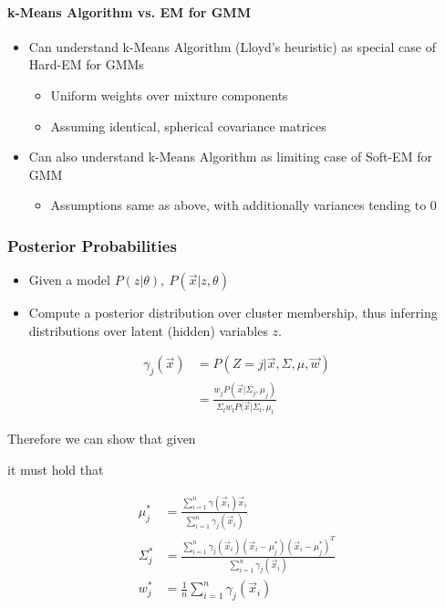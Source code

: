 \documentclass[10pt,a4paper]{scrartcl}
\newcommand{\Argmin}[2]{\text{arg}\underset{#1}{\min}\left(#2\right)}
\begin{document}
\begin{multicols*}{2}
\paragraph{k-Means Algorithm vs. EM for GMM}

\begin{itemize}
\item Can understand k-Means Algorithm (Lloyd's heuristic) as special case of Hard-EM for GMMs
\begin{itemize}
\item Uniform weights over mixture components
\item Assuming identical, spherical covariance matrices
\end{itemize}
\item Can also understand k-Means Algorithm as limiting case of Soft-EM for GMM
\begin{itemize}
\item Assumptions same as above, with additionally variances tending to 0
\end{itemize}
\end{itemize}

\subsubsection{Posterior Probabilities}

\begin{itemize}
\item Given a model $P(z|\theta),\ P(\vec{x}|z,\theta)$
\item Compute a posterior distribution over cluster membership, thus inferring distributions over latent (hidden) variables $z$.
\end{itemize}

\begin{align*}
\gamma_j(\vec{x})&=P(Z=j|\vec{x},\Sigma,\mu,\vec{w})\\
&=\frac{w_jP(\vec{x}|\Sigma_j,\mu_j)}{\Sigma_lw_lP(\vec{x}|\Sigma_l,\mu_l}
\end{align*}

Therefore we can show that given

\mportant{$(\mu^\ast, \Sigma^\ast,w^\ast)=\Argmin{}{-\sum\limits_i\log\sum\limits_{j=1}^kw_j\mathcal{N}(\vec{x}_i|\mu_j,\Sigma_j)}$}

it must hold that

\begin{align*}
\mu^\ast_j&=\frac{\sum\limits_{i=1}^n\gamma(\vec{x}_i)\vec{x}_i}{\sum\limits_{i=1}^n\gamma_j(\vec{x}_i)}\\
\Sigma_j^\ast&=\frac{\sum\limits_{i=1}^n\gamma_j(\vec{x}_i)(\vec{x}_i-\mu_j^\ast)(\vec{x}_i-\mu_j^\ast)^T}{\sum\limits_{i=1}^n\gamma_j(\vec{x}_i)}\\
w_j^\ast&=\frac{1}{n}\sum\limits_{i=1}^n\gamma_j(\vec{x}_i)
\end{align*}


\end{multicols*}
\end{document}
